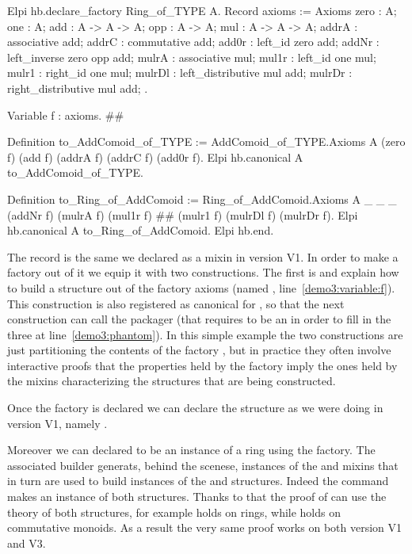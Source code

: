 \documentclass[a4paper,UKenglish,cleveref, autoref]{lipics-v2019}
\begin{document}
\begin{coqcode}
Elpi hb.declare_factory Ring_of_TYPE A.
  Record axioms := Axioms {
    zero : A;
    one : A;
    add : A -> A -> A;
    opp : A -> A;
    mul : A -> A -> A;
    addrA : associative add;
    addrC : commutative add;
    add0r : left_id zero add;
    addNr : left_inverse zero opp add;
    mulrA : associative mul;
    mul1r : left_id one mul;
    mulr1 : right_id one mul;
    mulrDl : left_distributive mul add;
    mulrDr : right_distributive mul add;
  }.

  Variable f : axioms.                            #\label{demo3:variable:f}#

  Definition to_AddComoid_of_TYPE :=
    AddComoid_of_TYPE.Axioms A (zero f) (add f) (addrA f) (addrC f) (add0r f).
  Elpi hb.canonical A to_AddComoid_of_TYPE.

  Definition to_Ring_of_AddComoid :=
    Ring_of_AddComoid.Axioms A _ _ _ (addNr f) (mulrA f) (mul1r f) #\label{demo3:phantom}#
      (mulr1 f) (mulrDl f) (mulrDr f).
  Elpi hb.canonical A to_Ring_of_AddComoid.
Elpi hb.end.
\end{coqcode}

The record  is the same we declared as a mixin
in version V1. In order to make a factory out of it we equip it with
two constructions. The first is  and
explain how to build a  structure out of the factory
axioms (named , line~\ref{demo3:variable:f}).
This construction is also registered as canonical for ,
so that the next construction  can call
the  packager (that requires  to be
an  in order to fill in the three \coq{_} at
line~\ref{demo3:phantom}). In this simple example the two constructions are just
partitioning the contents of the factory , but in practice they
often involve interactive proofs that the properties held by the factory
imply the ones held by the mixins characterizing the structures that are
being constructed.

Once the factory is declared we can declare the  structure
as we were doing in version V1, namely .

Moreover we can declared  to be an instance
of a ring using the  factory.
The associated builder generats, behind the scenese, instances of the
 and  mixins
that in turn are used to build instances of the  and 
structures. Indeed the command 
makes  an instance of both structures.
Thanks to that the proof of  can use the theory of
both structures, for example  holds on rings, while  holds
on commutative monoids. As a result the very same proof works on both
version V1 and V3.
\end{document}
